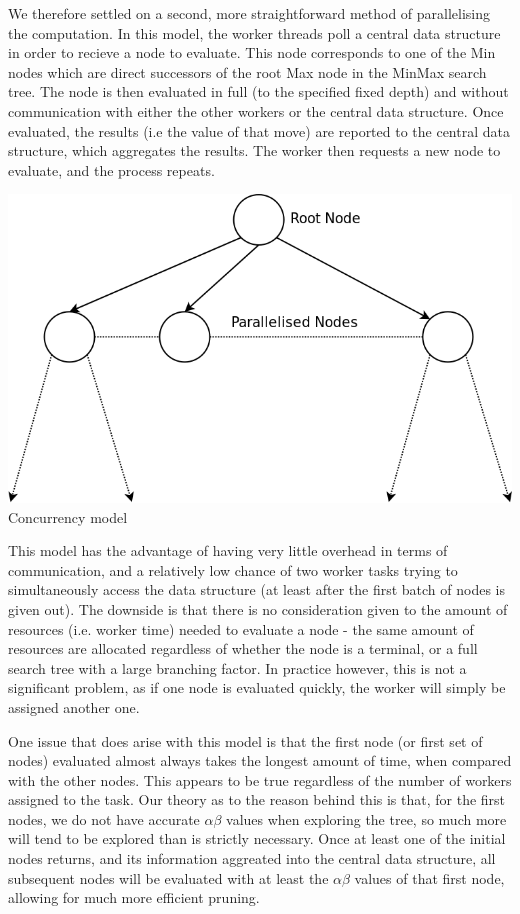 \documentclass[10pt]{report}
\begin{document}
\begin{multicols}{2}
We therefore settled on a second, more straightforward method of parallelising the computation. In this model, the worker threads poll a central data structure in order to recieve a node to evaluate. This node corresponds to one of the Min nodes which are direct successors of the root Max node in the MinMax search tree. The node is then evaluated in full (to the specified fixed depth) and without communication with either the other workers or the central data structure. Once evaluated, the results (i.e the value of that move) are reported to the central data structure, which aggregates the results. The worker then requests a new node to evaluate, and the process repeats.

\begin{center}
\includegraphics[scale=0.31]{concurrency.png}
\\Concurrency model
\end{center}

This model has the advantage of having very little overhead in terms of communication, and a relatively low chance of two worker tasks trying to simultaneously access the data structure (at least after the first batch of nodes is given out). The downside is that there is no consideration given to the amount of resources (i.e. worker time) needed to evaluate a node - the same amount of resources are allocated regardless of whether the node is a terminal, or a full search tree with a large branching factor. In practice however, this is not a significant problem, as if one node is evaluated quickly, the worker will simply be assigned another one.

One issue that does arise with this model is that the first node (or first set of nodes) evaluated almost always takes the longest amount of time, when compared with the other nodes. This appears to be true regardless of the number of workers assigned to the task. Our theory as to the reason behind this is that, for the first nodes, we do not have accurate $\alpha\beta$ values when exploring the tree, so much more will tend to be explored than is strictly necessary. Once at least one of the initial nodes returns, and its information aggreated into the central data structure, all subsequent nodes will be evaluated with at least the $\alpha\beta$ values of that first node, allowing for much more efficient pruning.


\end{multicols}
\end{document}
